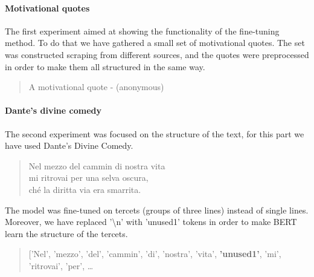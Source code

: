\documentclass[10pt,twocolumn,letterpaper]{article}
\begin{document}
\paragraph{Motivational quotes} The first experiment aimed at showing the functionality of the fine-tuning method.
To do that we have gathered a small set of motivational quotes.
The set was constructed scraping from different sources, and the quotes were preprocessed in order to make them
all structured in the same way.
\begin{quote}
   A motivational quote - (anonymous)
\end{quote}

\paragraph{Dante's divine comedy} The second experiment was focused on the structure of the text, for this part we have used Dante's Divine Comedy.

\begin{quote}
   Nel mezzo del cammin di nostra vita\\
   mi ritrovai per una selva oscura,\\
   ché la diritta via era smarrita.\\

\end{quote}
The model was fine-tuned on tercets (groups of three lines) instead of single lines.
Moreover, we have replaced '\textbackslash n' with 'unused1' tokens in order to make BERT learn the structure of the tercets.

\begin{quote}
['Nel', 'mezzo', 'del', 'cammin', 'di', 'nostra', 'vita', \textbf{'unused1'},
 'mi',
 'ritrovai',
 'per', \ldots
\end{quote}
\end{document}
